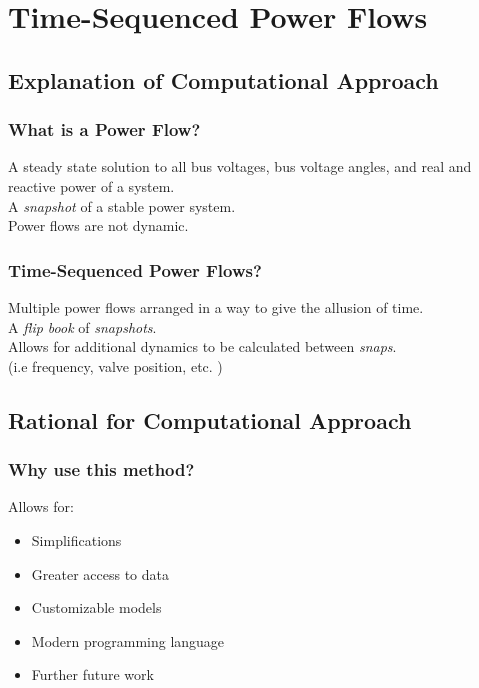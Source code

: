 \documentclass[14pt, unknownkeysallowed]{beamer}
\begin{document}
\section{Time-Sequenced Power Flows}
\subsection{Explanation of Computational Approach}
\begin{frame}
\frametitle{What is a Power Flow?}
A steady state solution to all bus voltages, bus voltage angles, and real  and reactive power of a system.\\
\vspace{1em}
A \emph{snapshot} of a stable power system. \\%
\vspace{1em}
Power flows are not dynamic.
\end{frame}
\begin{frame}
\frametitle{Time-Sequenced Power Flows?}
Multiple power flows arranged in a way to give the allusion of time.\\
\vspace{1em}
A \emph{flip book} of \emph{snapshots}.\\
\vspace{1em}
Allows for additional dynamics to be calculated between \emph{snaps}.\\(i.e frequency, valve position, etc. )\\
\end{frame}
\subsection{Rational for Computational Approach}
\begin{frame}
\frametitle{Why use this method?}
Allows for:
\begin{itemize}
\item Simplifications
\item Greater access to data
\item Customizable models
\item Modern programming language
\item Further future work
\end{itemize}
\end{frame}
\end{document}
